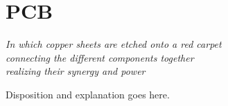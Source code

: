 \chapter{PCB}\label{ch:pcb}

\begin{flushright}{\slshape
    In which copper sheets are etched onto a red carpet\\
    connecting the different components together\\
    realizing their synergy and power
}
\end{flushright}

Disposition and explanation goes here. 









